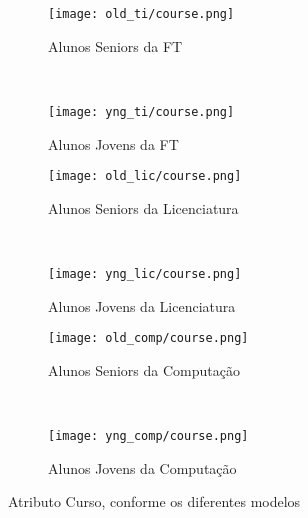 \clearpage
\begin{figure}[!ht]
    \centering
    \begin{subfigure}[b]{0.48\textwidth}
        \centering
        \texttt{[image: old\_ti/course.png]}
        \caption{Alunos Seniors da FT}
    \end{subfigure}
    ~
    \begin{subfigure}[b]{0.48\textwidth}
        \centering
        \texttt{[image: yng\_ti/course.png]}
        \caption{Alunos Jovens da FT}
    \end{subfigure}

    \begin{subfigure}[b]{0.48\textwidth}
        \centering
        \texttt{[image: old\_lic/course.png]}
        \caption{Alunos Seniors da Licenciatura}
    \end{subfigure}
    ~
    \begin{subfigure}[b]{0.48\textwidth}
        \centering
        \texttt{[image: yng\_lic/course.png]}
        \caption{Alunos Jovens da Licenciatura}
    \end{subfigure}

    \begin{subfigure}[b]{0.48\textwidth}
        \centering
        \texttt{[image: old\_comp/course.png]}
        \caption{Alunos Seniors da Computação}
    \end{subfigure}
    ~
    \begin{subfigure}[b]{0.48\textwidth}
        \centering
        \texttt{[image: yng\_comp/course.png]}
        \caption{Alunos Jovens da Computação}
    \end{subfigure}
    \caption{Atributo Curso, conforme os diferentes modelos}
\end{figure}

